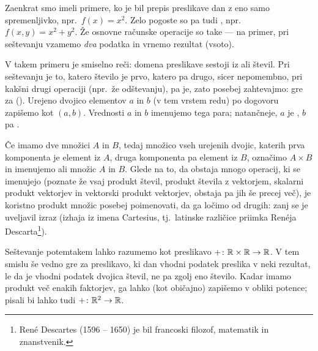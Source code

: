 

Zaenkrat smo imeli primere, ko je bil prepis preslikave dan z eno samo spremenljivko, npr.~$f(x) = x^2$. Zelo pogoste so pa tudi , npr.~$f(x, y) = x^2 + y^2$. Že osnovne računske operacije so take --- na primer, pri seštevanju vzamemo \emph{dva} podatka in vrnemo rezultat (vsoto).

V takem primeru je smiselno reči: domena preslikave sestoji iz  ali  števil. Pri seštevanju je to, katero število je prvo, katero pa drugo, sicer nepomembno, pri kakšni drugi operaciji (npr.~že odštevanju), pa je, zato posebej zahtevajmo: gre za  (). Urejeno dvojico elementov $a$ in $b$ (v tem vrstem redu) po dogovoru zapišemo kot $(a, b)$. Vrednosti $a$ in $b$ imenujemo  tega para; natančneje, $a$ je , $b$ pa .

Če imamo dve množici $A$ in $B$, tedaj množico vseh urejenih dvojic, katerih prva komponenta je element iz $A$, druga komponenta pa element iz $B$, označimo $A \times B$ in imenujemo  ali  množic $A$ in $B$. Glede na to, da obstaja mnogo operacij, ki se imenujejo  (poznate že vsaj produkt števil, produkt števila z vektorjem, skalarni produkt vektorjev in vektorski produkt vektorjev, obstaja pa jih še precej več), je koristno produkt množic posebej poimenovati, da ga ločimo od drugih: zanj se je uveljavil izraz  (izhaja iz imena Cartesius, tj.~latinske različice priimka Renéja Descarta\footnote{René Descartes (1596 -- 1650) je bil francoski filozof, matematik in znanstvenik.}).

Seštevanje potemtakem lahko razumemo kot preslikavo $+\colon \mathbb{R} \times \mathbb{R} \to \mathbb{R}$. V tem smislu še vedno gre za preslikavo, ki dan vhodni podatek preslika v neki rezultat, le da je vhodni podatek dvojica števil, ne pa zgolj eno število. Kadar imamo produkt več enakih faktorjev, ga lahko (kot običajno) zapišemo v obliki potence; pisali bi lahko tudi $+\colon \mathbb{R}^2 \to \mathbb{R}$.

